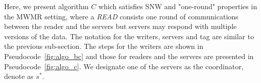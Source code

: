 Here, we present  algorithm  $C$ which satisfies  SNW and "one-round"  properties in the MWMR setting, where a \textit{READ} consists one round of communications between the reader and the servers but servers may respond with multiple versions of the data. %
The notation for the  writers, servers and tag are similar to the previous sub-section. 
The steps for the writers are shown in Pseudocode~\ref{fig:algo_bc} and  those for readers and the servers  are presented in Pseudocode~\ref{fig:algo_c}.
%
We designate one of the servers as the coordinator,  denote as $s^*$. 

